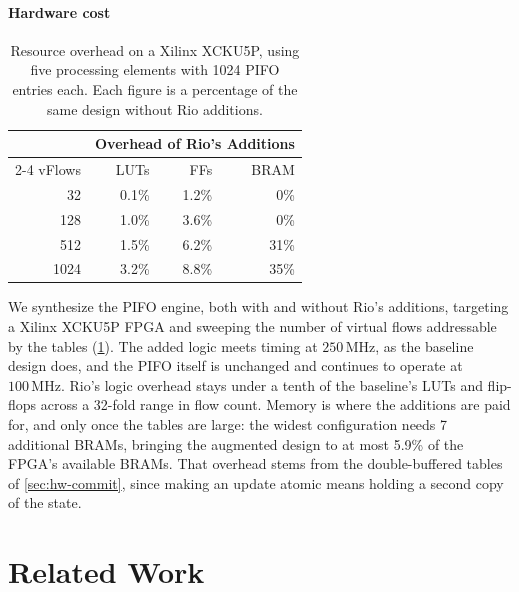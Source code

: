\documentclass[sigplan,anonymous,review,nonacm]{acmart}
\begin{document}
\paragraph{Hardware cost}

\begin{table}[t]
\centering
\small
\begin{tabular}{rrrr}
\toprule
& \multicolumn{3}{c}{Overhead of Rio's Additions} \\
\cmidrule(l){2-4}
vFlows & LUTs & FFs & BRAM \\ 
\midrule
32 & 0.1\% & 1.2\% & 0\% \\
128 & 1.0\% & 3.6\% & 0\% \\
512 & 1.5\% & 6.2\% & 31\% \\
1024 & 3.2\% & 8.8\% & 35\% \\
\bottomrule
\end{tabular}
\caption{Resource overhead on a Xilinx XCKU5P, using five processing elements with 1024 PIFO entries each. Each figure is a percentage of the same design without Rio additions.}
\label{tab:eval-resources}
\end{table}

We synthesize the PIFO engine, both with and without Rio's additions, targeting a Xilinx XCKU5P FPGA and sweeping the number of virtual flows addressable by the tables (\cref{tab:eval-resources}).
The added logic meets timing at $250\,\mathrm{MHz}$, as the baseline design does, and the PIFO itself is unchanged and continues to operate at $100\,\mathrm{MHz}$.
Rio's logic overhead stays under a tenth of the baseline's LUTs and flip-flops across a 32-fold range in flow count.
Memory is where the additions are paid for, and only once the tables are large: the widest configuration needs 7 additional BRAMs, bringing the augmented design to at most 5.9\% of the FPGA's available BRAMs.
That overhead stems from the double-buffered tables of \cref{sec:hw-commit}, since making an update atomic means holding a second copy of the state.


\section{Related Work}\label{sec:related}
\end{document}
